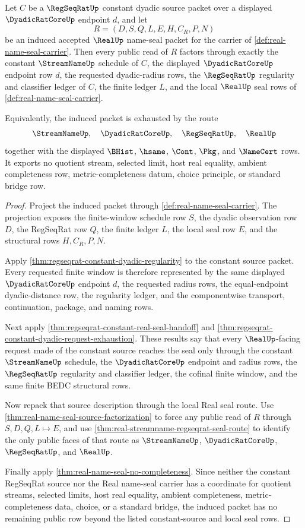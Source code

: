 \begin{theorem}
\label{thm:real-constant-dyadic-name-seal-exhaustion}
Let $C$ be a $\RegSeqRatUp$ constant dyadic source packet over a displayed $\DyadicRatCoreUp$ endpoint $d$, and let
$$
R=(D,S,Q,L,E,H,C_R,P,N)
$$
be an induced accepted $\RealUp$ name-seal packet for the carrier of \autoref{def:real-name-seal-carrier}. Then every public read of $R$ factors through exactly the constant $\StreamNameUp$ schedule of $C$, the displayed $\DyadicRatCoreUp$ endpoint row $d$, the requested dyadic-radius rows, the $\RegSeqRatUp$ regularity and classifier ledger of $C$, the finite ledger $L$, and the local $\RealUp$ seal rows of \autoref{def:real-name-seal-carrier}.

Equivalently, the induced packet is exhausted by the route
$$
\StreamNameUp,\quad \DyadicRatCoreUp,\quad \RegSeqRatUp,\quad \RealUp
$$
together with the displayed $\BHist$, $\hsame$, $\Cont$, $\Pkg$, and $\NameCert$ rows. It exports no quotient stream, selected limit, host real equality, ambient completeness row, metric-completeness datum, choice principle, or standard bridge row.
\end{theorem}
\begin{proof}
Project the induced packet through \autoref{def:real-name-seal-carrier}. The projection exposes the finite-window schedule row $S$, the dyadic observation row $D$, the RegSeqRat row $Q$, the finite ledger $L$, the local seal row $E$, and the structural rows $H,C_R,P,N$.

Apply \autoref{thm:regseqrat-constant-dyadic-regularity} to the constant source packet. Every requested finite window is therefore represented by the same displayed $\DyadicRatCoreUp$ endpoint $d$, the requested radius rows, the equal-endpoint dyadic-distance row, the regularity ledger, and the componentwise transport, continuation, package, and naming rows.

Next apply \autoref{thm:regseqrat-constant-real-seal-handoff} and \autoref{thm:regseqrat-constant-dyadic-request-exhaustion}. These results say that every $\RealUp$-facing request made of the constant source reaches the seal only through the constant $\StreamNameUp$ schedule, the $\DyadicRatCoreUp$ endpoint and radius rows, the $\RegSeqRatUp$ regularity and classifier ledger, the cofinal finite window, and the same finite BEDC structural rows.

Now repack that source description through the local Real seal route. Use \autoref{thm:real-name-seal-source-factorization} to force any public read of $R$ through $S,D,Q,L \longmapsto E$, and use \autoref{thm:real-streamname-regseqrat-seal-route} to identify the only public faces of that route as $\StreamNameUp$, $\DyadicRatCoreUp$, $\RegSeqRatUp$, and $\RealUp$.

Finally apply \autoref{thm:real-name-seal-no-completeness}. Since neither the constant RegSeqRat source nor the Real name-seal carrier has a coordinate for quotient streams, selected limits, host real equality, ambient completeness, metric-completeness data, choice, or a standard bridge, the induced packet has no remaining public row beyond the listed constant-source and local seal rows.
\end{proof}

